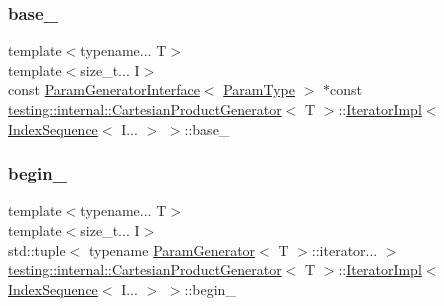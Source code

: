 \subsubsection{\texorpdfstring{base\_}{base\_}}
{\footnotesize\ttfamily template$<$typename... T$>$ \\
template$<$size\+\_\+t... I$>$ \\
const \mbox{\hyperlink{classtesting_1_1internal_1_1_param_generator_interface}{Param\+Generator\+Interface}}$<$ \mbox{\hyperlink{classtesting_1_1internal_1_1_cartesian_product_generator_af27131157a9347f0c82420ca081ee7dd}{Param\+Type}} $>$ $\ast$const \mbox{\hyperlink{classtesting_1_1internal_1_1_cartesian_product_generator}{testing\+::internal\+::\+Cartesian\+Product\+Generator}}$<$ T $>$\+::\mbox{\hyperlink{classtesting_1_1internal_1_1_cartesian_product_generator_1_1_iterator_impl}{Iterator\+Impl}}$<$ \mbox{\hyperlink{structtesting_1_1internal_1_1_index_sequence}{Index\+Sequence}}$<$ I... $>$ $>$\+::base\+\_\+\hspace{0.3cm}{\ttfamily [private]}}

\mbox{\label{classtesting_1_1internal_1_1_cartesian_product_generator_1_1_iterator_impl_3_01_index_sequence_3_01_i_8_8_8_01_4_01_4_a25fa130f4ee9bc3a297456b471e34172}} 
\subsubsection{\texorpdfstring{begin\_}{begin\_}}
{\footnotesize\ttfamily template$<$typename... T$>$ \\
template$<$size\+\_\+t... I$>$ \\
std\+::tuple$<$ typename \mbox{\hyperlink{classtesting_1_1internal_1_1_param_generator}{Param\+Generator}}$<$ T $>$\+::iterator... $>$ \mbox{\hyperlink{classtesting_1_1internal_1_1_cartesian_product_generator}{testing\+::internal\+::\+Cartesian\+Product\+Generator}}$<$ T $>$\+::\mbox{\hyperlink{classtesting_1_1internal_1_1_cartesian_product_generator_1_1_iterator_impl}{Iterator\+Impl}}$<$ \mbox{\hyperlink{structtesting_1_1internal_1_1_index_sequence}{Index\+Sequence}}$<$ I... $>$ $>$\+::begin\+\_\+\hspace{0.3cm}{\ttfamily [private]}}

